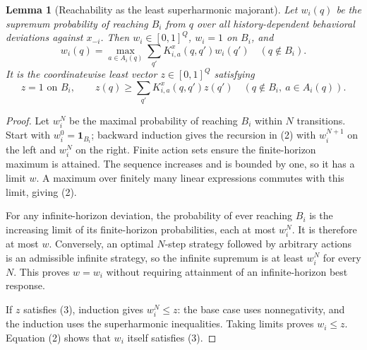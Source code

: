 \documentclass[11pt]{article}
\newtheorem{lemma}[theorem]{Lemma}
\theoremstyle{remark}\newtheorem{remark}[theorem]{Remark}
\begin{document}
\begin{lemma}[Reachability as the least superharmonic majorant]\label{lem:mdp}
Let $w_i(q)$ be the supremum probability of reaching $B_i$ from $q$ over all history-dependent behavioral deviations against $x_{-i}$. Then $w_i\in[0,1]^Q$, $w_i=1$ on $B_i$, and
\[
 w_i(q)=\max_{a\in A_i(q)}\sum_{q'}K_{i,a}^x(q,q')w_i(q')
 \quad(q\notin B_i).                                             \tag{2}
\]
It is the coordinatewise least vector $z\in[0,1]^Q$ satisfying
\[
 z=1\text{ on }B_i,\qquad
 z(q)\geq\sum_{q'}K_{i,a}^x(q,q')z(q')\quad(q\notin B_i,\ a\in A_i(q)). \tag{3}
\]
\end{lemma}
\begin{proof}
Let $w_i^N$ be the maximal probability of reaching $B_i$ within $N$ transitions. Start with $w_i^0=\mathbf1_{B_i}$; backward induction gives the recursion in (2) with $w_i^{N+1}$ on the left and $w_i^N$ on the right. Finite action sets ensure the finite-horizon maximum is attained. The sequence increases and is bounded by one, so it has a limit $w$. A maximum over finitely many linear expressions commutes with this limit, giving (2).

For any infinite-horizon deviation, the probability of ever reaching $B_i$ is the increasing limit of its finite-horizon probabilities, each at most $w_i^N$. It is therefore at most $w$. Conversely, an optimal $N$-step strategy followed by arbitrary actions is an admissible infinite strategy, so the infinite supremum is at least $w_i^N$ for every $N$. This proves $w=w_i$ without requiring attainment of an infinite-horizon best response.

If $z$ satisfies (3), induction gives $w_i^N\leq z$: the base case uses nonnegativity, and the induction uses the superharmonic inequalities. Taking limits proves $w_i\leq z$. Equation (2) shows that $w_i$ itself satisfies (3).
\end{proof}
\end{document}
